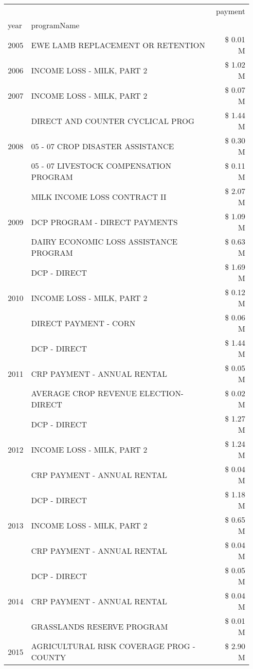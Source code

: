 \begin{tabular}{llr}
\toprule
 &  & payment \\
year & programName &  \\
\midrule
2005 & EWE LAMB REPLACEMENT OR RETENTION & \$ 0.01 M \\
\cline{1-3}
2006 & INCOME LOSS - MILK, PART 2 & \$ 1.02 M \\
\cline{1-3}
2007 & INCOME LOSS - MILK, PART 2 & \$ 0.07 M \\
\cline{1-3}
\multirow[t]{3}{*}{2008} & DIRECT AND COUNTER CYCLICAL PROG & \$ 1.44 M \\
 & 05 - 07 CROP DISASTER ASSISTANCE & \$ 0.30 M \\
 & 05 - 07 LIVESTOCK COMPENSATION PROGRAM & \$ 0.11 M \\
\cline{1-3}
\multirow[t]{3}{*}{2009} & MILK INCOME LOSS CONTRACT II & \$ 2.07 M \\
 & DCP PROGRAM - DIRECT PAYMENTS & \$ 1.09 M \\
 & DAIRY ECONOMIC LOSS ASSISTANCE PROGRAM & \$ 0.63 M \\
\cline{1-3}
\multirow[t]{3}{*}{2010} & DCP - DIRECT & \$ 1.69 M \\
 & INCOME LOSS - MILK, PART 2 & \$ 0.12 M \\
 & DIRECT PAYMENT - CORN & \$ 0.06 M \\
\cline{1-3}
\multirow[t]{3}{*}{2011} & DCP - DIRECT & \$ 1.44 M \\
 & CRP PAYMENT - ANNUAL RENTAL & \$ 0.05 M \\
 & AVERAGE CROP REVENUE ELECTION-DIRECT & \$ 0.02 M \\
\cline{1-3}
\multirow[t]{3}{*}{2012} & DCP - DIRECT & \$ 1.27 M \\
 & INCOME LOSS - MILK, PART 2 & \$ 1.24 M \\
 & CRP PAYMENT - ANNUAL RENTAL & \$ 0.04 M \\
\cline{1-3}
\multirow[t]{3}{*}{2013} & DCP - DIRECT & \$ 1.18 M \\
 & INCOME LOSS - MILK, PART 2 & \$ 0.65 M \\
 & CRP PAYMENT - ANNUAL RENTAL & \$ 0.04 M \\
\cline{1-3}
\multirow[t]{3}{*}{2014} & DCP - DIRECT & \$ 0.05 M \\
 & CRP PAYMENT - ANNUAL RENTAL & \$ 0.04 M \\
 & GRASSLANDS RESERVE PROGRAM & \$ 0.01 M \\
\cline{1-3}
\multirow[t]{3}{*}{2015} & AGRICULTURAL RISK COVERAGE PROG - COUNTY & \$ 2.90 M \\

\end{tabular}
